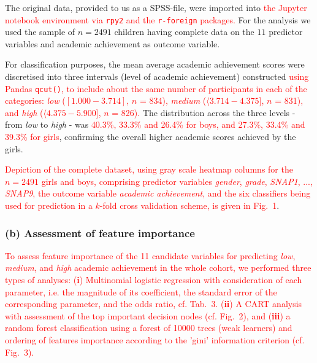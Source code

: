 \documentclass[10pt,letterpaper]{article}
\begin{document}
The original data, provided to us as a SPSS-file, were imported into \textcolor{red}{the Jupyter notebook environment via {\tt rpy2} and the {\tt r-foreign} packages.} 
For the analysis we used the sample of  $n=2491$ children having complete data 
on the $11$ predictor variables and academic achievement as outcome variable.

 For classification purposes, the mean average academic achievement scores were discretised into three intervals (level of academic achievement) constructed
 \textcolor{red}{using Pandas {\tt qcut()}, to include about the same number of participants in each of the categories:  
{\it low} ($[1.000 - 3.714]$,  $n$ = 834),
{\it medium} ($\langle 3.714 - 4.375]$, $n$ = 831), and
{\it high} ($\langle 4.375 - 5.900]$, $n$ = 826). }
The distribution across the three levels - from {\it low} to {\it high} - was 
\textcolor{red}{40.3\%, 33.3\% and 26.4\% for boys, and 27.3\%, 33.4\% and 39.3\% for girls}, 
confirming the overall higher academic scores achieved by the girls. 

\textcolor{red}{Depiction of the complete dataset,  using gray scale heatmap columns for the $n=2491$  girls and boys, comprising predictor variables {\it gender}, {\it grade}, 
{\it SNAP1}, ..., {\it SNAP9}, the outcome variable {\it academic achievement}, and the
 six classifiers being used for prediction in a $k$-fold cross validation scheme, is given in Fig.~1}.
 
 \subsubsection*{(b) Assessment of feature importance} 
  \textcolor{red}{To assess feature importance of the 11 candidate variables for predicting {\it low}, {\it medium}, and {\it high} academic achievement in the whole cohort,
 we performed three types of analyses: ({\bf i}) Multinomial logistic regression with consideration of each parameter, i.e. the magnitude of its coefficient, the standard error of the corresponding parameter, and the odds ratio, cf. Tab.~3. 
 ({\bf ii}) A CART analysis with assessment 
 of the top important decision nodes (cf. Fig.~2), and ({\bf iii}) a random forest classification using a forest of 10000 trees (weak learners) and ordering of features importance according
  to the 'gini' information criterion (cf. Fig.~3). }
 
\end{document}
